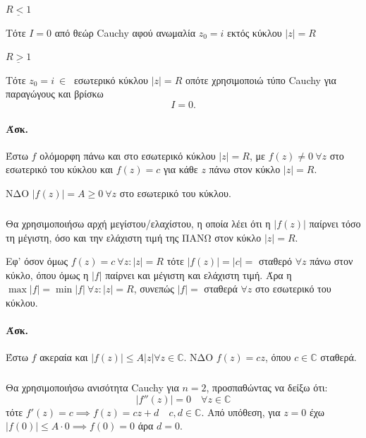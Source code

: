 \documentclass[12pt,a4paper,notitlepage,fleqn]{article}
\begin{document}

    \begin{enumgreekparen}
    	\item \( \underline{R < 1} \)

    	Τότε \( I = 0 \) από θεώρ Cauchy αφού ανωμαλία \( z_0 = i \) εκτός κύκλου
    	\( |z| = R \)

    	\item \( \underline{R>1} \)

    	Τότε \( z_0 = i \ \in \ \) εσωτερικό κύκλου \( |z| = R \) οπότε χρησιμοποιώ τύπο
    	Cauchy για παραγώγους και βρίσκω \[ I = 0. \]
    \end{enumgreekparen}

    \paragraph{Άσκ. }
    Έστω \( f \) ολόμορφη πάνω και στο εσωτερικό κύκλου \( |z| = R \), με
    \( f(z) \neq 0\ \forall z \) στο εσωτερικό του κύκλου και \( f(z) = c \) για κάθε
    \( z \) πάνω στον κύκλο \( |z| = R \).

    ΝΔΟ \( \left|f(z)\right| = A \geq 0 \ \forall z \) στο εσωτερικό του κύκλου.

    \subparagraph{}
    Θα χρησιμοποιήσω αρχή μεγίστου/ελαχίστου, η οποία λέει ότι η \( \left|f(z)\right| \)
    παίρνει τόσο τη μέγιστη, όσο και την ελάχιστη τιμή της ΠΑΝΩ στον κύκλο \( |z|=R \).

    Εφ' όσον όμως \( f(z) = c\ \forall z: |z| = R \) τότε \( \left|f(z)\right| = |c| = \)
    σταθερό \( \forall z \) πάνω στον κύκλο, όπου όμως η \( |f| \) παίρνει και μέγιστη και
    ελάχιστη τιμή. Άρα η \( \max |f| = \min |f| \ \forall z:|z| = R \), συνεπώς
    \( |f| =  \) σταθερά \( \forall z \) στο εσωτερικό του κύκλου.

    \paragraph{Άσκ.}
    Έστω \( f \) ακεραία και \( \left|f(z)\right| \leq A|z| \forall z\in\mathbb C  \).
    ΝΔΟ \( f(z) = cz \), όπου \( c \in \mathbb C  \) σταθερά.
    \subparagraph{}
    Θα χρησιμοποιήσω ανισότητα Cauchy για \( n=2 \), προσπαθώντας να δείξω ότι:
    \[
    \left|f''(z)\right| = 0 \quad \forall z \in \mathbb C
    \]
    τότε \( f'(z) = c \implies f(z) = cz+d \quad c,d\in\mathbb C  \). Από υπόθεση,
    για \( z=0 \) έχω \( \left|f(0)\right| \leq A \cdot 0 \implies f(0) = 0 \) άρα \(d = 0\).
\end{document}
